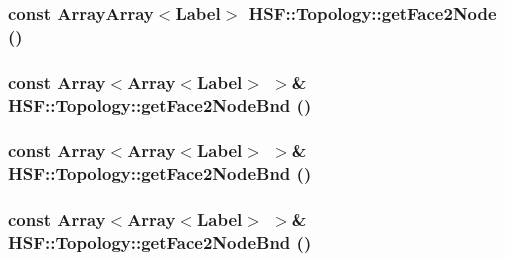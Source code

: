 \label{classHSF_1_1Topology_a6e6fd144f43943e4cffbfda646441942}
\hypertarget{classHSF_1_1Topology_a6e6fd144f43943e4cffbfda646441942}{
\subsubsection[{getFace2Node}]{\setlength{\rightskip}{0pt plus 5cm}const {\bf ArrayArray}$<${\bf Label}$>$ HSF::Topology::getFace2Node ()}}
\label{classHSF_1_1Topology_a6e6fd144f43943e4cffbfda646441942}
\hypertarget{classHSF_1_1Topology_afda78d036de3096e8da7fe88705b2371}{
\subsubsection[{getFace2NodeBnd}]{\setlength{\rightskip}{0pt plus 5cm}const Array$<$Array$<${\bf Label}$>$ $>$\& HSF::Topology::getFace2NodeBnd ()}}
\label{classHSF_1_1Topology_afda78d036de3096e8da7fe88705b2371}
\hypertarget{classHSF_1_1Topology_afda78d036de3096e8da7fe88705b2371}{
\subsubsection[{getFace2NodeBnd}]{\setlength{\rightskip}{0pt plus 5cm}const Array$<$Array$<${\bf Label}$>$ $>$\& HSF::Topology::getFace2NodeBnd ()}}
\label{classHSF_1_1Topology_afda78d036de3096e8da7fe88705b2371}
\hypertarget{classHSF_1_1Topology_afda78d036de3096e8da7fe88705b2371}{
\subsubsection[{getFace2NodeBnd}]{\setlength{\rightskip}{0pt plus 5cm}const Array$<$Array$<${\bf Label}$>$ $>$\& HSF::Topology::getFace2NodeBnd ()}}
